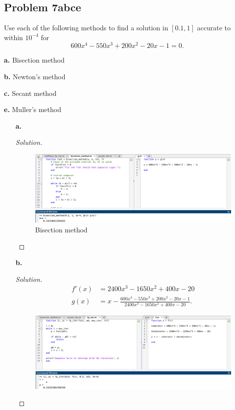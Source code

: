 \documentclass{article}
\begin{document}
\subsection*{Problem 7abce}
Use each of the following methods to find a solution in $[0.1, 1]$ accurate to within $10^{-4}$ 
for $$600x^4-550x^3+200x^2-20x-1=0.$$
\begin{enumerate*}
    \item[\textbf{a.}] Bisection method 
    \item[\textbf{b.}] Newton's method
    \item[\textbf{c.}] Secant method
    \item[\textbf{e.}] Muller's method
\end{enumerate*}
\begin{enumerate}
    \item[\textbf{a.}]
    \begin{proof}[Solution]\indent
        \begin{figure}[htb!]
            \centering
            \includegraphics[scale=0.35]{2.6.7a.png}
            \caption{Bisection method}
        \end{figure}
    \end{proof}
    \item[\textbf{b.}]  
    \begin{proof}[Solution]
        \begin{align*}
            f'(x) & = 2400x^3-1650x^2+400x-20 \\
            g(x) & = x-\frac{600x^4-550x^3+200x^2-20x-1}{2400x^3-1650x^2+400x-20}.
        \end{align*}
        \begin{figure}[htb!]
            \centering
            \includegraphics[scale=0.35]{2.6.7b.png}

\end{figure}
\end{proof}
\end{enumerate}
\end{document}
